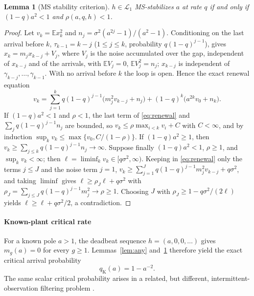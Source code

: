 \documentclass[preprint,12pt,numbers]{elsarticle}
\newtheorem{lemma}{Lemma}
\theoremstyle{definition}
\newcommand{\E}{\mathbb{E}}
\newcommand{\Lone}{\mathcal{L}_1}
\newcommand{\qK}{q_{\mathrm K}}
\begin{document}
\begin{lemma}[MS stability criterion]\label{lem:ms}
$h\in\Lone$ MS-stabilizes $a$ at rate $q$ if and only if $(1-q)a^2<1$ and $\rho(a,q,h)<1$.
\end{lemma}
\begin{proof}
Let $v_k=\E x_k^2$ and $n_j=\sigma^2(a^{2j}-1)/(a^2-1)$. Conditioning on the last arrival before $k$, $\tau_{k-1}=k-j$ ($1\le j\le k$, probability $q(1-q)^{j-1}$), gives $x_k=m_j x_{k-j}+V_j$, where $V_j$ is the noise accumulated over the gap, independent of $x_{k-j}$ and of the arrivals, with $\E V_j=0$, $\E V_j^2=n_j$; $x_{k-j}$ is independent of $\gamma_{k-j},\dots,\gamma_{k-1}$. With no arrival before $k$ the loop is open. Hence the exact renewal equation
\begin{equation}\label{eq:renewal}
v_k=\sum_{j=1}^{k}q(1-q)^{j-1}\bigl(m_j^2v_{k-j}+n_j\bigr)+(1-q)^k\bigl(a^{2k}v_0+n_k\bigr).
\end{equation}
If $(1-q)a^2<1$ and $\rho<1$, the last term of \eqref{eq:renewal} and $\sum_jq(1-q)^{j-1}n_j$ are bounded, so $v_k\le\rho\max_{i<k}v_i+C$ with $C<\infty$, and by induction $\sup_kv_k\le\max\{v_0,C/(1-\rho)\}$. If $(1-q)a^2\ge1$, then $v_k\ge\sum_{j\le k}q(1-q)^{j-1}n_j\to\infty$. Suppose finally $(1-q)a^2<1$, $\rho\ge1$, and $\sup_kv_k<\infty$; then $\ell=\liminf_kv_k\in[q\sigma^2,\infty)$. Keeping in \eqref{eq:renewal} only the terms $j\le J$ and the noise term $j=1$, $v_k\ge\sum_{j=1}^Jq(1-q)^{j-1}m_j^2v_{k-j}+q\sigma^2$, and taking $\liminf$ gives $\ell\ge\rho_J\ell+q\sigma^2$ with $\rho_J=\sum_{j\le J}q(1-q)^{j-1}m_j^2\to\rho\ge1$. Choosing $J$ with $\rho_J\ge1-q\sigma^2/(2\ell)$ yields $\ell\ge\ell+q\sigma^2/2$, a contradiction.
\end{proof}


\paragraph{Known-plant critical rate}
For a known pole $a>1$, the deadbeat sequence
$h=(a,0,0,\ldots)$ gives $m_g(a)=0$ for every $g\ge1$.
Lemmas~\ref{lem:any} and~\ref{lem:ms} therefore yield the
exact critical arrival probability
\[
\qK(a)=1-a^{-2}.
\]
The same scalar critical probability arises in a related,
but different, intermittent-observation filtering problem
\citep{sinopoli2004}.
\end{document}
